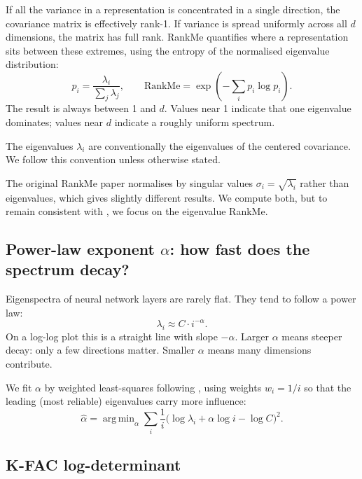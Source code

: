 \documentclass[11pt,a4paper]{article}
\DeclareMathOperator*{\argmin}{arg\,min}
\begin{document}
If all the variance in a representation is concentrated in a single direction, the covariance matrix is effectively rank-1.
If variance is spread uniformly across all $d$ dimensions, the matrix has full rank.
RankMe \citep{garrido2023rankme} quantifies where a representation sits between these extremes, using the entropy of the normalised eigenvalue distribution:
\begin{equation}
  p_i = \frac{\lambda_i}{\sum_j \lambda_j}, \qquad
  \text{RankMe} = \exp\!\left(-\sum_i p_i \log p_i\right).
\end{equation}
The result is always between 1 and $d$.
Values near 1 indicate that one eigenvalue dominates; values near $d$ indicate a roughly uniform spectrum.

The eigenvalues $\lambda_i$ are conventionally the eigenvalues of the centered covariance. We follow this convention unless otherwise stated.

The original RankMe paper normalises by singular values $\sigma_i = \sqrt{\lambda_i}$ rather than eigenvalues, which gives slightly different results.
We compute both, but to remain consistent with \citet{li2025tracing}, we focus on the eigenvalue RankMe.

\subsection{Power-law exponent \texorpdfstring{$\alpha$}{alpha}: how fast does the spectrum decay?}

Eigenspectra of neural network layers are rarely flat.
They tend to follow a power law:
\begin{equation}
  \lambda_i \approx C \cdot i^{-\alpha}.
\end{equation}
On a log-log plot this is a straight line with slope $-\alpha$.
Larger $\alpha$ means steeper decay: only a few directions matter.
Smaller $\alpha$ means many dimensions contribute.

We fit $\alpha$ by weighted least-squares following \citet{stringer2019highdimensional}, using weights $w_i = 1/i$ so that the leading (most reliable) eigenvalues carry more influence:
\begin{equation}
  \hat\alpha = \argmin_\alpha \sum_{i} \frac{1}{i} \bigl(\log\lambda_i + \alpha\log i - \log C\bigr)^2.
\end{equation}

\subsection{K-FAC log-determinant}
\end{document}
